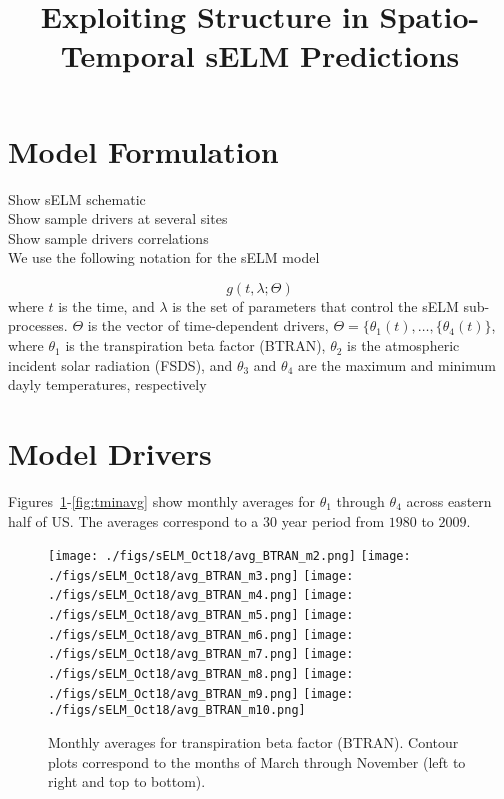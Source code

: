 \documentclass[10pt]{article}
\begin{document}
 

\title{Exploiting Structure in Spatio-Temporal sELM Predictions}
\author{}
\maketitle

\section{Model Formulation}

\color{red} Show sELM schematic \color{black}\\
\color{red} Show sample drivers at several sites \color{black}\\
\color{red} Show sample drivers correlations \color{black}\\

We use the following notation for the sELM model 

\begin{equation}
g(t, \lambda; \Theta)
\end{equation}
where $t$ is the time, and $\lambda$ is the set of parameters that control the sELM 
sub-processes.  $\Theta$ is the vector of time-dependent drivers, 
$\Theta=\{\theta_1(t),\ldots,\{\theta_4(t)\}$, where 
$\theta_1$ is the transpiration beta factor (BTRAN), $\theta_2$ is the
atmospheric incident solar radiation (FSDS), and $\theta_3$ and $\theta_4$ are
the maximum and minimum dayly temperatures, respectively


\section{Model Drivers}

Figures~\ref{fig:btranavg}-\ref{fig:tminavg} show monthly averages for $\theta_1$ 
through $\theta_4$ across eastern half of US. The averages correspond to a 30 year period
from $1980$ to $2009$.

\begin{figure}[htb!]
\centering
\texttt{[image: ./figs/sELM\_Oct18/avg\_BTRAN\_m2.png]}
\texttt{[image: ./figs/sELM\_Oct18/avg\_BTRAN\_m3.png]}
\texttt{[image: ./figs/sELM\_Oct18/avg\_BTRAN\_m4.png]}
\texttt{[image: ./figs/sELM\_Oct18/avg\_BTRAN\_m5.png]}
\texttt{[image: ./figs/sELM\_Oct18/avg\_BTRAN\_m6.png]}
\texttt{[image: ./figs/sELM\_Oct18/avg\_BTRAN\_m7.png]}
\texttt{[image: ./figs/sELM\_Oct18/avg\_BTRAN\_m8.png]}
\texttt{[image: ./figs/sELM\_Oct18/avg\_BTRAN\_m9.png]}
\texttt{[image: ./figs/sELM\_Oct18/avg\_BTRAN\_m10.png]}
\caption{Monthly averages for transpiration beta factor (BTRAN). Contour plots correspond 
to the months of March through November (left to right and top to bottom).\label{fig:btranavg}}
\end{figure}
\end{document}
